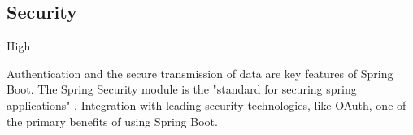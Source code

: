 \subsection*{Security}

\ranking High

Authentication and the secure transmission of data are key features of Spring Boot. The Spring Security module is the "standard for securing spring applications" \cite{springSecurity}. Integration with leading security technologies, like OAuth, one of the primary benefits of using Spring Boot.